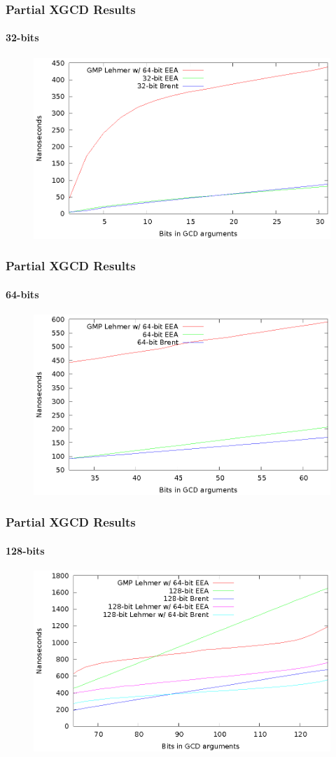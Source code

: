 \documentclass{beamer}
\begin{document}
\begin{frame}
\frametitle{Partial XGCD Results}
\framesubtitle{32-bits}
\begin{figure}
\includegraphics[scale=0.86]{best-partial-32}
\end{figure}
\end{frame}
\begin{frame}
\frametitle{Partial XGCD Results}
\framesubtitle{64-bits}
\begin{figure}
\includegraphics[scale=0.86]{best-partial-64}
\end{figure}
\end{frame}
\begin{frame}
\frametitle{Partial XGCD Results}
\framesubtitle{128-bits}
\begin{figure}
\includegraphics[scale=0.86]{best-partial-128}
\end{figure}
\end{frame}
\end{document}

